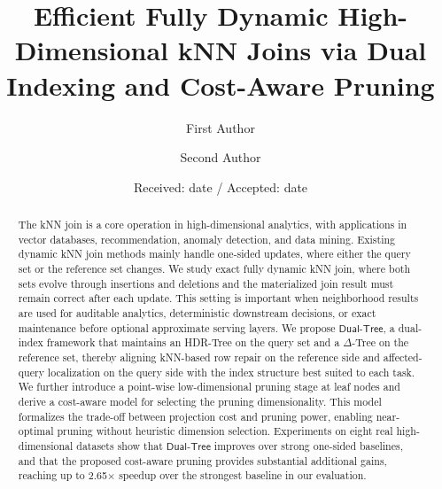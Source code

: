 \documentclass[twocolumn]{svjour3}
\newcommand{\kw}[1]{{\ensuremath{\mathsf{#1}}}\xspace}
\newcommand{\dualtree}{\kw{Dual}-\kw{Tree}}
\newcommand{\hdrtree}{HDR-Tree\xspace}
\newcommand{\deltatree}{$\Delta$-Tree\xspace}
\begin{document}
\title{Efficient Fully Dynamic High-Dimensional kNN Joins via Dual Indexing and Cost-Aware Pruning}

\author{First Author \and Second Author}

\date{Received: date / Accepted: date}

\maketitle

\begin{abstract}
The kNN join is a core operation in high-dimensional analytics, with applications in vector databases, recommendation, anomaly detection, and data mining. Existing dynamic kNN join methods mainly handle one-sided updates, where either the query set or the reference set changes. We study exact fully dynamic kNN join, where both sets evolve through insertions and deletions and the materialized join result must remain correct after each update. This setting is important when neighborhood results are used for auditable analytics, deterministic downstream decisions, or exact maintenance before optional approximate serving layers. We propose \dualtree, a dual-index framework that maintains an \hdrtree on the query set and a \deltatree on the reference set, thereby aligning kNN-based row repair on the reference side and affected-query localization on the query side with the index structure best suited to each task. We further introduce a point-wise low-dimensional pruning stage at leaf nodes and derive a cost-aware model for selecting the pruning dimensionality. This model formalizes the trade-off between projection cost and pruning power, enabling near-optimal pruning without heuristic dimension selection. Experiments on eight real high-dimensional datasets show that \dualtree improves over strong one-sided baselines, and that the proposed cost-aware pruning provides substantial additional gains, reaching up to 2.65$\times$ speedup over the strongest baseline in our evaluation.
\end{abstract}
\end{document}

